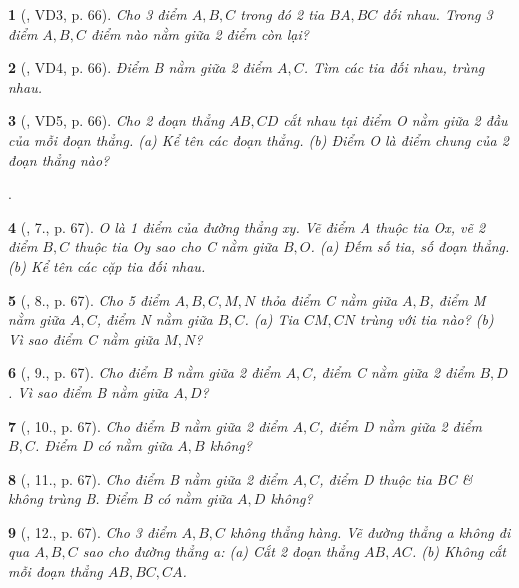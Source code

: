 \documentclass{article}
\newtheorem{baitoan}{}
\begin{document}
\begin{baitoan}[\cite{Binh_Toan_6_tap_2}, VD3, p. 66]
	Cho 3 điểm $A,B,C$ trong đó 2 tia $BA,BC$ đối nhau. Trong 3 điểm $A,B,C$ điểm nào nằm giữa 2 điểm còn lại?
\end{baitoan}

\begin{baitoan}[\cite{Binh_Toan_6_tap_2}, VD4, p. 66]
	Điểm B nằm giữa 2 điểm $A,C$. Tìm các tia đối nhau, trùng nhau.
\end{baitoan}

\begin{baitoan}[\cite{Binh_Toan_6_tap_2}, VD5, p. 66]
	Cho 2 đoạn thẳng $AB,CD$ cắt nhau tại điểm O nằm giữa 2 đầu của mỗi đoạn thẳng. (a) Kể tên các đoạn thẳng. (b) Điểm O là điểm chung của 2 đoạn thẳng nào?
\end{baitoan}
\noindent\cite[VD6, p. 66, 14., p. 68]{Binh_Toan_6_tap_2}.

\begin{baitoan}[\cite{Binh_Toan_6_tap_2}, 7., p. 67]
	O là 1 điểm của đường thẳng xy. Vẽ điểm A thuộc tia Ox, vẽ 2 điểm $B,C$ thuộc tia Oy sao cho C nằm giữa $B,O$. (a) Đếm số tia, số đoạn thẳng. (b) Kể tên các cặp tia đối nhau.
\end{baitoan}

\begin{baitoan}[\cite{Binh_Toan_6_tap_2}, 8., p. 67]
	Cho 5 điểm $A,B,C,M,N$ thỏa điểm C nằm giữa $A,B$, điểm M nằm giữa $A,C$, điểm N nằm giữa $B,C$. (a) Tia $CM,CN$ trùng với tia nào? (b) Vì sao điểm C nằm giữa $M,N$?
\end{baitoan}

\begin{baitoan}[\cite{Binh_Toan_6_tap_2}, 9., p. 67]
	Cho điểm B nằm giữa 2 điểm $A,C$, điểm C nằm giữa 2 điểm $B,D$. Vì sao điểm B nằm giữa $A,D$?
\end{baitoan}

\begin{baitoan}[\cite{Binh_Toan_6_tap_2}, 10., p. 67]
	Cho điểm B nằm giữa 2 điểm $A,C$, điểm D nằm giữa 2 điểm $B,C$. Điểm D có nằm giữa $A,B$ không?
\end{baitoan}

\begin{baitoan}[\cite{Binh_Toan_6_tap_2}, 11., p. 67]
	Cho điểm B nằm giữa 2 điểm $A,C$, điểm D thuộc tia BC \& không trùng B. Điểm B có nằm giữa $A,D$ không?
\end{baitoan}

\begin{baitoan}[\cite{Binh_Toan_6_tap_2}, 12., p. 67]
	Cho 3 điểm $A,B,C$ không thẳng hàng. Vẽ đường thẳng a không đi qua $A,B,C$ sao cho đường thẳng a: (a) Cắt 2 đoạn thẳng $AB,AC$. (b) Không cắt mỗi đoạn thẳng $AB,BC,CA$.
\end{baitoan}
\end{document}

